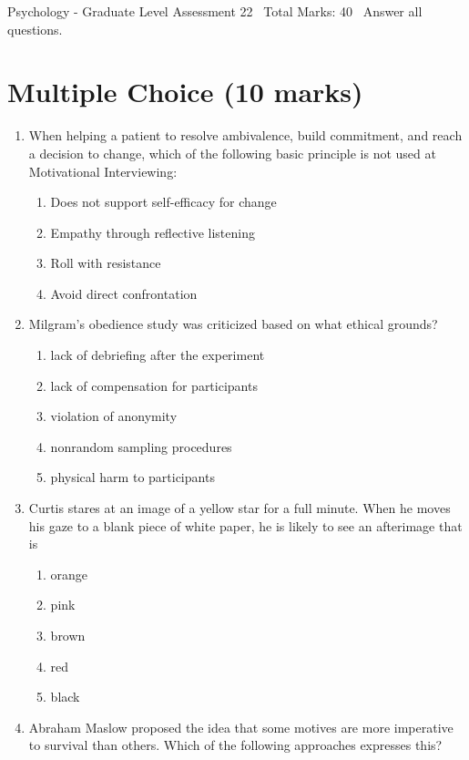 \documentclass[12pt]{article}
\begin{document}
\begin{center}
Psychology - Graduate Level Assessment 22 \
Total Marks: 40 \
Answer all questions.
\end{center}

\section*{Multiple Choice (10 marks)}
\begin{enumerate}[label=\arabic*.]
\item When helping a patient to resolve ambivalence, build commitment, and reach a decision to change, which of the following basic principle is not used at Motivational Interviewing:
\begin{enumerate}[label=(\alph*)]
    \item Does not support self-efficacy for change
    \item Empathy through reflective listening
    \item Roll with resistance
    \item Avoid direct confrontation
\end{enumerate}
\item Milgram's obedience study was criticized based on what ethical grounds?
\begin{enumerate}[label=(\alph*)]
    \item lack of debriefing after the experiment
    \item lack of compensation for participants
    \item violation of anonymity
    \item nonrandom sampling procedures
    \item physical harm to participants
\end{enumerate}
\item Curtis stares at an image of a yellow star for a full minute. When he moves his gaze to a blank piece of white paper, he is likely to see an afterimage that is
\begin{enumerate}[label=(\alph*)]
    \item orange
    \item pink
    \item brown
    \item red
    \item black
\end{enumerate}
\item Abraham Maslow proposed the idea that some motives are more imperative to survival than others. Which of the following approaches expresses this?

\end{enumerate}
\end{document}
